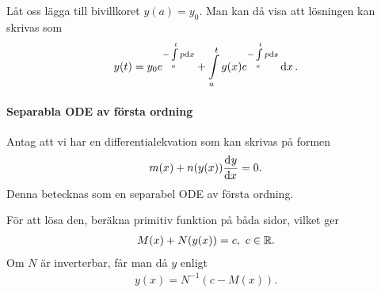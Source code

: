 Låt oss lägga till bivillkoret $y(a) = y_0$. Man kan då visa att lösningen kan skrivas som
\begin{align*}
	y(t) = y_0e^{-\int\limits_{a}^{t}p\dd{x}} + \int\limits_{a}^{t}g(x)e^{-\int\limits_{x}^{t}p\dd{s}}\dd{x}.
\end{align*}

\paragraph{Separabla ODE av första ordning}
Antag att vi har en differentialekvation som kan skrivas på formen
\begin{align*}
	m(x) + n(y(x))\dv[]{y}{x} (x) = 0.
\end{align*}
Denna betecknas som en separabel ODE av första ordning.

För att lösa den, beräkna primitiv funktion på båda sidor, vilket ger
\begin{align*}
	M(x) + N(y(x)) = c,\ c\in\mathbb{R}.
\end{align*}
Om $N$ är inverterbar, får man då $y$ enligt
\begin{align*}
	y(x) = N^{-1}(c - M(x)).
\end{align*}